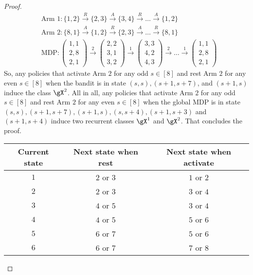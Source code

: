 \begin{proof}
    \begin{align*}
        &\text{Arm 1} : \{1,2\} \overset{R}{\to} \{2,3\} \overset{A}{\to} \{3,4\} \overset{R}{\to} \dots \overset{A}{\to} \{1,2\} \\
        &\text{Arm 2} : \{8,1\} \overset{A}{\to} \{1,2\} \overset{R}{\to} \{2,3\} \overset{A}{\to} \dots \overset{R}{\to} \{8,1\} \\
        &\text{MDP} : \begin{pmatrix}1,1\\2,8\\2,1\end{pmatrix} \overset{2}{\to} \begin{pmatrix}2,2\\3,1\\3,2\end{pmatrix} \overset{1}{\to} \begin{pmatrix}3,3\\4,2\\4,3\end{pmatrix} \overset{2}{\to} \dots \overset{1}{\to} \begin{pmatrix}1,1\\2,8\\2,1\end{pmatrix}
    \end{align*}
    So, any policies that activate Arm $2$ for any odd $s\in[8]$ and rest Arm $2$ for any even $s\in[8]$ when the bandit is in state $(s,s), (s+1,s+7)$, and $(s+1,s)$ induce the class $\gX^2$.
    All in all, any policies that activate Arm $2$ for any odd $s\in[8]$ and rest Arm $2$ for any even $s\in[8]$ when the global MDP is in state $(s,s), (s+1,s+7), (s+1,s), (s,s+4), (s+1,s+3)$ and $(s+1,s+4)$ induce two recurrent classes $\gX^1$ and $\gX^2$.
    That concludes the proof.
    \begin{table}[ht]
        \centering
        \begin{tabular}{|c|c|c|}
            \hline
            Current state & Next state when rest & Next state when activate \\\hline 
            $1$   & $2$ or $3$  &  $1$ or $2$ \\
            $2$   & $2$ or $3$  &  $3$ or $4$ \\
            $3$   & $4$ or $5$  &  $3$ or $4$ \\
            $4$   & $4$ or $5$  &  $5$ or $6$ \\
            $5$   & $6$ or $7$  &  $5$ or $6$ \\
            $6$   & $6$ or $7$  &  $7$ or $8$ \\

\end{tabular}
\end{table}
\end{proof}
